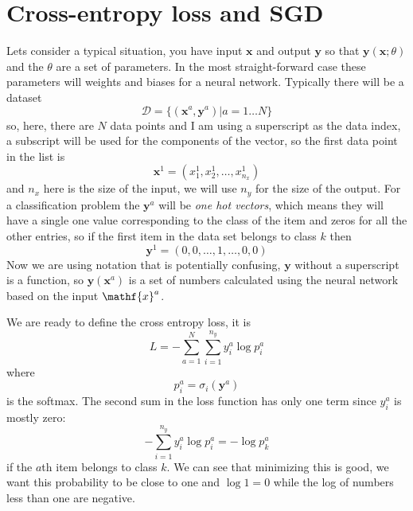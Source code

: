 \documentclass[12pt]{article}
\begin{document}
\section*{Cross-entropy loss and SGD}

Lets consider a typical situation, you have input $\mathbf{x}$ and
output $\mathbf{y}$ so that $\mathbf{y}(\textbf{x};\theta)$ and the
$\theta$ are a set of parameters. In the most straight-forward case
these parameters will weights and biases for a neural
network. Typically there will be a dataset
\begin{equation}
  \mathcal{D}=\{(\mathbf{x}^a,\mathbf{y}^a)|a=1\ldots N\}
\end{equation}
so, here, there are $N$ data points and I am using a superscript as
the data index, a subscript will be used for the components of the
vector, so the first data point in the list is
\begin{equation}
  \mathbf{x}^1=(x^1_1,x^1_2,\ldots,x^1_{n_x})
\end{equation}
and $n_x$ here is the size of the input, we will use $n_y$ for the
size of the output. For a classification problem the $\mathbf{y}^a$
will be \textsl{one hot vectors}, which means they will have a single
one value corresponding to the class of the item and zeros for all the
other entries, so if the first item in the data set belongs to class
$k$ then
\begin{equation}
  \mathbf{y}^1=(0,0,\ldots,1,\ldots,0,0)
\end{equation}
Now we are using notation that is potentially confusing, $\mathbf{y}$
without a superscript is a function, so $\mathbf{y}(\mathbf{x}^a)$ is
a set of numbers calculated using the neural network based on the
input $\mathf{x}^a$.

We are ready to define the cross entropy loss, it is
\begin{equation}
  L=-\sum_{a=1}^N \sum_{i=1}^{n_y}y_i^a \log{p_i^a}
\end{equation}
where
\begin{equation}
  p_i^a=\sigma_i(\mathbf{y}^a)
\end{equation}
is the softmax. The second sum in the loss function has only one term
since $y_i^a$ is mostly zero:
\begin{equation}
  -\sum_{i=1}^{n_y}y_i^a \log{p_i^a}=-\log{p_k^a}
\end{equation}
if the $a$th item belongs to class $k$. We can see that minimizing
this is good, we want this probability to be close to one and
$\log{1}=0$ while the log of numbers less than one are negative. 
\end{document}
